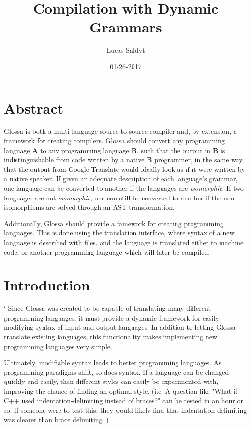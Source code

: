 \documentclass{article}
\title{Compilation with Dynamic Grammars}
\date{01-26-2017}
\author{Lucas Saldyt}
\begin{document}
\maketitle
{}
\newpage
{}

\section{Abstract}
Glossa is both a multi-language source to source compiler and, by extension, a framework for creating compilers.
Glossa should convert any programming language \textbf{A} to any programming language \textbf{B}, such that the output in \textbf{B} is indistinguishable from code written by a native \textbf{B} programmer, in the same way that the output from Google Translate would ideally look as if it were written by a native speaker.
If given an adequate description of each language's grammar, one language can be converted to another if the languages are \textit{isomorphic}.
If two languages are not \textit{isomorphic}, one can still be converted to another if the non-isomorphisms are solved through an AST transformation.

Additionally, Glossa should provide a famework for creating programming languages.
This is done using the translation interface, where syntax of a new language is described with files, and the language is translated either to machine code, or another programming language which will later be compiled.

\section{Introduction}
`
Since Glossa was created to be capable of translating many different programming languages, it must provide a dynamic framework for easily modifying syntax of input and output languages. 
In addition to letting Glossa translate existing languages, this functionality makes implementing new programming languages very simple.

Ultimately, modifiable syntax leads to better programming languages.
As programming paradigms shift, so does syntax. 
If a language can be changed quickly and easily, then different styles can easily be experimented with, improving the chance of finding an optimal style.
(i.e. A question like "What if C++ used indentation-delimiting instead of braces?" can be tested in an hour or so. If someone were to test this, they would likely find that indentation delimiting was clearer than brace delimiting..)
\end{document}
